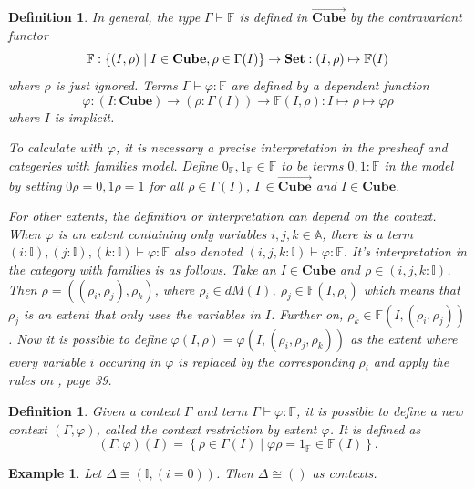 \documentclass[12pt,a4paper,twoside,xetex]{book} %
\newcommand{\keyword}[1]{\emph{#1}\index{#1}}
\newtheorem{definition}[theorem]{Definition}
\newtheorem{example}[theorem]{Example}
\newcommand{\psh}[1]{\overrightarrow{#1}}
\newcommand{\cube}[0]{\textbf{Cube}}
\begin{document}
\begin{definition}
In general, the type $\Gamma \vdash \mathbb{F}$ is defined in $\psh{\cube}$ by the contravariant functor $$\mathbb{F} : \left\{ (I, \rho) \mid  I \in 
\cube,  \rho \in \Gamma (I) \right\} \rightarrow \set: (I, \rho) \mapsto 
\mathbb{F}(I)$$ where $\rho$ is just ignored. Terms $\Gamma \vdash \varphi : 
\mathbb{F}$ are defined by a dependent function $$\varphi : (I : \cube) 
\rightarrow (\rho : \Gamma (I)) \rightarrow  \mathbb{F}(I,\rho): I \mapsto \rho 
\mapsto \varphi \rho $$ where $I$ is implicit.

To calculate with $\varphi$, it is necessary a precise interpretation in the 
presheaf and categeries with families model. Define $ 0_{\mathbb{F}}, 
1_{\mathbb{F}} \in \mathbb{F}$ to be terms $0,1 : \mathbb{F}$ in the model by 
setting \(0 \rho = 0, 1 \rho = 1\) for all $\rho \in \Gamma (I)$, $\Gamma \in 
\psh{\cube}$ and $I \in \cube$.  

For other extents, the definition or interpretation can depend on the context. 
When $\varphi$ is an extent containing only variables $i,j,k \in \mathbb{A}$, 
there is a term $(i: \mathbb{I}), (j: \mathbb{I}), (k: \mathbb{I}) \vdash 
\varphi : \mathbb{F}$ also denoted $(i,j,k: \mathbb{I}) \vdash \varphi : 
\mathbb{F}$. It's interpretation in the category with families is as follows. 
Take an $I \in \cube$ and  $\rho \in (i,j,k: \mathbb{I})$. Then $\rho = 
((\rho_i, \rho_j), \rho_k)$, where $\rho_i \in dM(I)$, $\rho_j \in 
\mathbb{F}(I,\rho_i)$ which means that $\rho_j$ is an extent that only uses the 
variables in $I$. Further on, $\rho_k \in \mathbb{F}(I, (\rho_i, \rho_j))$. Now 
it is possible to define $\varphi(I,\rho)=\varphi(I,(\rho_i,\rho_j,\rho_k))$ as 
the extent where every variable $i$ occuring in $\varphi$ is replaced by the 
corresponding $\rho_i$ and apply the rules on \cite{Orton2019}, page 39.
\end{definition}



\begin{definition}\label{contextrestriction}
Given a context $\Gamma$ and term $\Gamma \vdash \varphi : \mathbb{F}$, it is 
possible to define a new context $(\Gamma , \varphi)$, called the 
\keyword{context restriction by extent $\varphi$}. It is defined as  $$(\Gamma 
, \varphi)(I) = \left\{ \rho \in \Gamma (I) \mid \varphi \rho = 1_{\mathbb{F}} 
\in \mathbb{F}(I) \right \} .$$
\end{definition}
 
\begin{example}
Let $\Delta \equiv (\mathbb{I}, (i=0))$. Then 
$\Delta \cong ()$ as contexts.
\end{example} 
\end{document}
